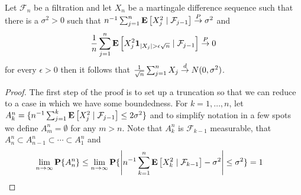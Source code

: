 \begin{thm}Let $\mathcal{F}_n$ be a
  filtration and let $X_n$ be a martingale
  difference sequence such that there is a $\sigma^2 > 0$ such that $n^{-1} \sum_{j=1}^n
  \cexpectationlong{\mathcal{F}_{j-1}}{X^2_j} \toprob \sigma^2$ and 
\begin{align*}
\frac{1}{n} \sum_{j=1}^n  \cexpectationlong{\mathcal{F}_{j-1}}{X^2_j
  \characteristic{\abs{X_j} > \epsilon \sqrt{n}}} \toprob 0
\end{align*}
for every $\epsilon > 0$ then it follows that $\frac{1}{\sqrt{n}}
\sum_{j=1}^n X_j \todist N(0,\sigma^2)$.
\end{thm}
\begin{proof}
The first step of the proof is to set up a truncation so that we can
reduce to a case in which we have some boundedness.
For $k=1, \dotsc, n$, let $A^n_k = \lbrace n^{-1} \sum_{j=1}^k
  \cexpectationlong{\mathcal{F}_{j-1}}{X^2_j} \leq 2 \sigma^2 \rbrace$
  and to simplify notation in a few spots we define $A^n_m = \emptyset$ for any $m > n$.
Note that $A^n_k$ is $\mathcal{F}_{k-1}$ measurable, that 
  $A^n_n \subset A^n_{n-1} \subset \dotsb \subset A^n_1$ and 
\begin{align*}
\lim_{n \to \infty} \probability{A^n_n} &\leq \lim_{n \to \infty} \probability{\abs{n^{-1} \sum_{k=1}^n
  \cexpectationlong{\mathcal{F}_{k-1}}{X^2_k} - \sigma^2} \leq \sigma^2}
                                          = 1
\end{align*}


\end{proof}
